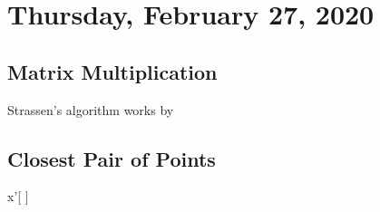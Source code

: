 \section{Thursday, February 27, 2020}


\subsection{Matrix Multiplication}
Strassen's algorithm works by 


\subsection{Closest Pair of Points}

x'[
]